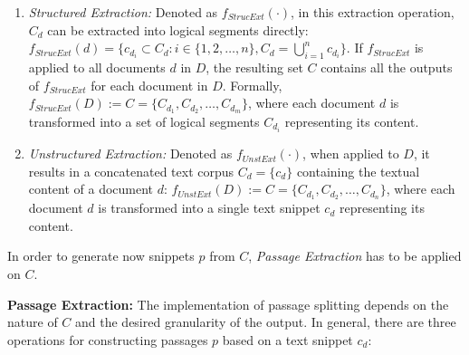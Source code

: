 \begin{enumerate}
    \item \textit{Structured Extraction:} Denoted as $f_{StrucExt}(\cdot)$, in this extraction operation, $C_d$ can be extracted into logical segments directly: $f_{StrucExt}(d) = \{c_{d_i} \subset C_d : i \in \{1, 2, \ldots, n\}, C_d = \bigcup_{i=1}^{n} c_{d_i}\}$. If $f_{StrucExt}$ is applied to all documents $d$ in $D$, the resulting set $C$ contains all the outputs of $f_{StrucExt}$ for each document in $D$. Formally, $f_{StrucExt}(D) := C = \{C_{d_1}, C_{d_2}, \dots, C_{d_m}\}$, where each document $d$ is transformed into a set of logical segments $C_{d_i}$ representing its content.
    \item \textit{Unstructured Extraction:} Denoted as $f_{UnstExt}(\cdot)$, when applied to $D$, it results in a concatenated text corpus $C_d = \{c_d\} $ containing the textual content of a document $d$: $f_{UnstExt}(D) := C = \{C_{d_1}, C_{d_2}, \dots, C_{d_n}\}$, where each document $d$ is transformed into a single text snippet $c_d$ representing its content.
\end{enumerate}

In order to generate now snippets $p$ from $C$, \textit{Passage Extraction} has to be applied on $C$.

\vspace{\baselineskip} %

\noindent\textbf{Passage Extraction:} The implementation of passage splitting depends on the nature of $C$ and the desired granularity of the output. In general, there are three operations for constructing passages $p$ based on a text snippet $c_d$:

